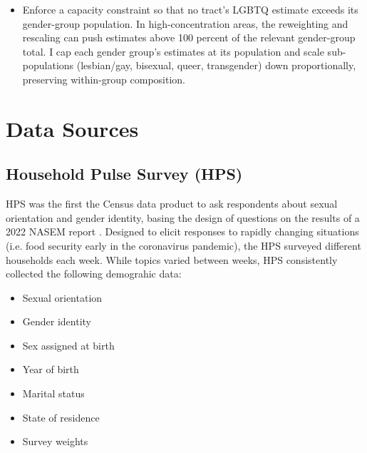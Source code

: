 \documentclass[11pt]{article}
\begin{document}
\begin{itemize}
  The reweighting produces a calibration factor for each PUMA, but applying
  that factor as a hard step function at PUMA boundaries introduces visual
  discontinuities in the map that are artifacts of the PUMA delineation
  rather than real demographic transitions. To address this, I smooth the
  calibration factors to the tract level using inverse-distance weighting
  (IDW): each tract receives a distance-weighted blend of all PUMA factors
  rather than the factor of whichever PUMA it happens to fall in. This
  preserves the geographic heterogeneity the calibration is meant to capture
  while producing a spatially continuous surface.

\item Enforce a capacity constraint so that no tract's LGBTQ estimate exceeds
  its gender-group population. In high-concentration areas, the reweighting
  and rescaling can push estimates above 100 percent of the relevant
  gender-group total. I cap each gender group's estimates at its population
  and scale sub-populations (lesbian/gay, bisexual, queer, transgender) down
  proportionally, preserving within-group composition.
\end{itemize}

\section*{Data Sources}

\subsection*{Household Pulse Survey (HPS)}

HPS was the first the Census data product to ask respondents about sexual
orientation and gender identity, basing the design of questions on the
results of a 2022 NASEM report \citep{nasem2022}. Designed to elicit responses to rapidly
changing situations (i.e. food security early in the coronavirus pandemic),
the HPS surveyed different households each week. While topics varied between
weeks, HPS consistently collected the following demograhic data:

\begin{itemize}[itemsep=0.1em]
\item Sexual orientation
\item Gender identity
\item Sex assigned at birth
\item Year of birth
\item Marital status
\item State of residence
\item Survey weights
\end{itemize}
\end{document}
